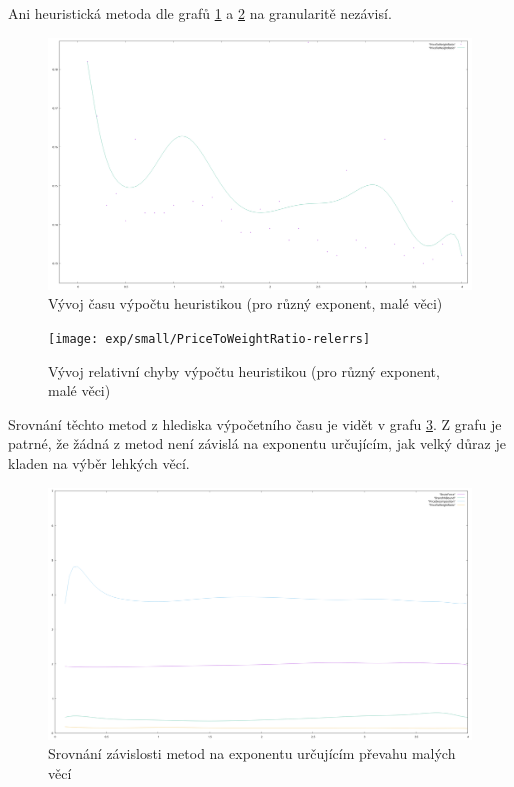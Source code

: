 \documentclass[12pt,a4paper]{article}
\begin{document}
Ani heuristická metoda dle grafů \ref{exp/small/PriceToWeightRatio} a  \ref{exp/small/PriceToWeightRatio-relerrs} na granularitě nezávisí. 

\begin{figure}[H]
\begin{center}
\includegraphics[width=\textwidth]{exp/small/PriceToWeightRatio}
\caption{Vývoj času výpočtu heuristikou (pro různý exponent, malé věci)}
\label{exp/small/PriceToWeightRatio}
\end{center}
\end{figure}

\begin{figure}[H]
\begin{center}
\texttt{[image: exp/small/PriceToWeightRatio-relerrs]}
\caption{Vývoj relativní chyby výpočtu heuristikou (pro různý exponent, malé věci)}
\label{exp/small/PriceToWeightRatio-relerrs}
\end{center}
\end{figure}

Srovnání těchto metod z hlediska výpočetního času je vidět v grafu \ref{exp/small/allExecTimes}. Z grafu je patrné, že žádná z metod není závislá na exponentu určujícím, jak velký důraz je kladen na výběr lehkých věcí.

\begin{figure}[H]
\begin{center}
\includegraphics[width=\textwidth]{exp/small/allExecTimes}
\caption{Srovnání závislosti metod na exponentu určujícím převahu malých věcí}
\label{exp/small/allExecTimes}
\end{center}
\end{figure}
\end{document}

